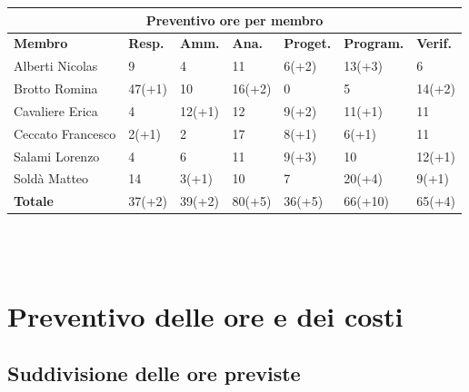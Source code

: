 \documentclass[a4paper, 12pt]{article}
\begin{document}
\begin{center}
	\begin{tabularx}{\textwidth}{|X|X|X|X|X|X|X|}
		\hline
		\multicolumn{7}{|c|}{\textbf{Preventivo ore per membro}}                                            \\
		\hline
		\hline
		\textbf{Membro}   & \textbf{Resp.}    & \textbf{Amm.}   & \textbf{Ana.} &
		\textbf{Proget.}  & \textbf{Program.} & \textbf{Verif.}                                             \\
		\hline
		Alberti Nicolas   & 9                 & 4               & 11            & 6(+2)  & 13(+3)  & 6      \\
		\hline
		Brotto Romina     & 47(+1)            & 10              & 16(+2)        & 0      & 5       & 14(+2) \\
		\hline
		Cavaliere Erica   & 4                 & 12(+1)          & 12            & 9(+2)  & 11(+1)  & 11     \\
		\hline
		Ceccato Francesco & 2(+1)             & 2               & 17            & 8(+1)  & 6(+1)   & 11     \\
		\hline
		Salami Lorenzo    & 4                 & 6               & 11            & 9(+3)  & 10      & 12(+1) \\
		\hline
		Soldà Matteo      & 14                & 3(+1)           & 10            & 7      & 20(+4)  & 9(+1)  \\
		\hline
		\hline
		\textbf{Totale}   & 37(+2)            & 39(+2)          & 80(+5)        & 36(+5) & 66(+10) & 65(+4) \\
		\hline
	\end{tabularx}\\[8pt]
	\mbox{}\\
\end{center}



\newpage

\section{Preventivo delle ore e dei costi}

\subsection{Suddivisione delle ore previste}
\end{document}
